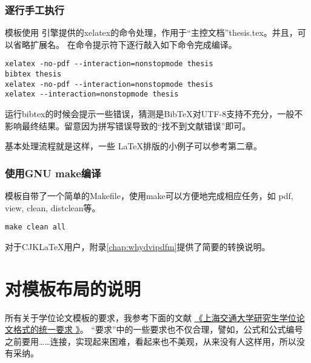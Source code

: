 \subsubsection{逐行手工执行}

模板使用 \XeTeX 引擎提供的xelatex的命令处理，作用于“主控文档”thesis.tex。并且，可以省略扩展名。
在命令提示符下逐行敲入如下命令完成编译。

\begin{lstlisting}[basicstyle=\small\ttfamily, caption={手动执行编译过程}, numbers=none]
xelatex -no-pdf --interaction=nonstopmode thesis
bibtex thesis 
xelatex -no-pdf --interaction=nonstopmode thesis
xelatex --interaction=nonstopmode thesis 
\end{lstlisting}

运行bibtex的时候会提示一些错误，猜测是{{\sc Bib}\TeX}对UTF-8支持不充分，一般不影响最终结果。留意因为拼写错误导致的``找不到文献错误''即可。

基本处理流程就是这样，一些 \LaTeX 排版的小例子可以参考第二章。

\subsubsection{使用GNU make编译}

模板自带了一个简单的Makefile，使用make可以方便地完成相应任务，如 pdf, view, clean, distclean等。

\begin{lstlisting}[basicstyle=\small\ttfamily, caption={使用GNU make编译}, numbers=none]
make clean all
\end{lstlisting}

对于CJK\LaTeX{}用户，附录\ref{chap:whydvipdfm}提供了简要的转换说明。

\section{对模板布局的说明}
\label{sec:thesisformat}

所有关于学位论文模板的要求，我参考下面的文献
\href{http://www.gs.sjtu.edu.cn/policy/fileShow.ahtml?id=130}{《上海交通大学研究生学位论文格式的统一要求 》}。
``要求''中的一些要求也不仅合理，譬如，公式和公式编号之前要用……连接，实现起来困难，看起来也不美观，从来没有人这样用，所以没有采纳。

